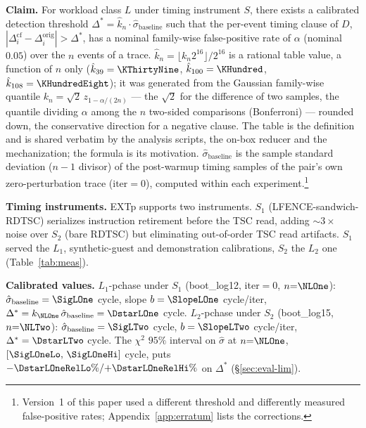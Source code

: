 \documentclass[conference]{IEEEtran}
\newcommand{\sigbase}{\hat{\sigma}_\text{baseline}}
\newcommand{\Dstar}{\Delta^{*}}
\begin{document}
\textbf{Claim.} For workload class $L$ under timing instrument $S$,
there exists a calibrated detection threshold $\Dstar = \hat{k}_n
\cdot \sigbase$ such that the per-event timing clause of $D$,
$|\Delta_i^{\text{cf}} - \Delta_i^{\text{orig}}| > \Dstar$, has a
nominal family-wise false-positive rate of $\alpha$ (nominal $0.05$)
over the $n$ events of a trace. $\hat{k}_n = \lfloor k_n
2^{16}\rfloor / 2^{16}$ is a rational table value, a function of $n$
only ($\hat{k}_{39} = \KThirtyNine$, $\hat{k}_{100} = \KHundred$,
$\hat{k}_{108} = \KHundredEight$); it was generated from the Gaussian
family-wise quantile $k_n = \sqrt{2}\, z_{1-\alpha/(2n)}$ --- the
$\sqrt{2}$ for the difference of two samples, the quantile dividing
$\alpha$ among the $n$ two-sided comparisons (Bonferroni) --- rounded
down, the conservative direction for a negative clause. The table is
the definition and is shared verbatim by the analysis scripts, the
on-box reducer and the mechanization; the formula is its
motivation. $\sigbase$ is
the sample standard deviation ($n{-}1$ divisor) of the post-warmup
timing samples of the pair's own zero-perturbation trace
($\text{iter}{=}0$), computed within each experiment.\ifzenodo\footnote{Version~1
of this paper used a different threshold and differently measured
false-positive rates; Appendix~\ref{app:erratum} lists the corrections.}\fi

\textbf{Timing instruments.} EXTp supports two instruments. $S_1$
(LFENCE-sandwich-RDTSC) serializes instruction retirement before the
TSC read, adding ${\sim}3\times$ noise over $S_2$ (bare RDTSC) but
eliminating out-of-order TSC read artifacts. $S_1$ served the $L_1$,
synthetic-guest and demonstration calibrations, $S_2$ the $L_2$ one
(Table~\ref{tab:meas}).

\textbf{Calibrated values.} $L_1$-pchase under $S_1$ (boot\_log12,
iter$=0$, $n{=}\NLOne$): $\sigbase = \SigLOne$ cycle, slope $b =
\SlopeLOne$ cycle/iter, $\Dstar = k_{\NLOne}\,\sigbase = \DstarLOne$
cycle. $L_2$-pchase under $S_2$ (boot\_log15, $n{=}\NLTwo$): $\sigbase
= \SigLTwo$ cycle, $b = \SlopeLTwo$ cycle/iter, $\Dstar = \DstarLTwo$
cycle. The $\chi^2$ $95\%$ interval on $\hat{\sigma}$ at $n{=}\NLOne$,
$[\SigLOneLo,\,\SigLOneHi]$ cycle, puts
${-}\DstarLOneRelLo\%/{+}\DstarLOneRelHi\%$ on $\Dstar$
(\S\ref{sec:eval-lim}).
\end{document}
